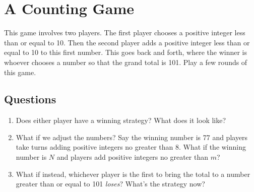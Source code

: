 \documentclass[12pt]{article}
\begin{document}
\newpage %

\section*{A Counting Game}
This game involves two players. The first player chooses a positive integer less than or equal to 10. Then the second player adds a positive integer less than or equal to 10 to this first number. This goes back and forth, where the winner is whoever chooses a number so that the grand total is 101. Play a few rounds of this game.

\subsection*{Questions}
\begin{enumerate}
	\item Does either player have a winning strategy? What does it look like?
	\vspace{4cm}
	\item What if we adjust the numbers? Say the winning number is 77 and players take turns adding positive integers no greater than 8. What if the winning number is $N$ and players add positive integers no greater than $m$?
	\vspace{4cm}
	\item What if instead, whichever player is the first to bring the total to a number greater than or equal to 101 \textit{loses}? What's the strategy now?
\end{enumerate}

\newpage
\end{document}
